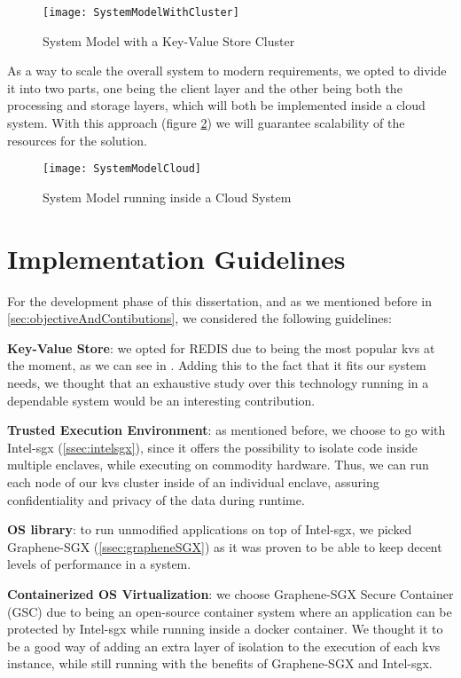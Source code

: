 \begin{figure}[htbp]
	\centering
	{\texttt{[image: SystemModelWithCluster]}}
	\caption{System Model with a Key-Value Store Cluster}
	\label{fig:systemModelCluster}
\end{figure}

As a way to scale the overall system to modern requirements, we opted to divide it into two parts, one being the client layer and the other being both the processing and storage layers, which will both be implemented inside a cloud system. With this approach (figure \ref{fig:systemModelCloud}) we will guarantee scalability of the resources for the solution. 

\begin{figure}[htbp]
	\centering
	{\texttt{[image: SystemModelCloud]}}
	\caption{System Model running inside a Cloud System}
	\label{fig:systemModelCloud}
\end{figure}

\section{Implementation Guidelines} %

For the development phase of this dissertation, and as we mentioned before in \ref{sec:objectiveAndContibutions}, we considered the following guidelines:

\textbf{Key-Value Store}: we opted for REDIS due to being the most popular \gls{kvs} at the moment, as we can see in \cite{rankingKVStores}. Adding this to the fact that it fits our system needs, we thought that an exhaustive study over this technology running in a dependable system would be an interesting contribution.

\textbf{Trusted Execution Environment}: as mentioned before, we choose to go with Intel-\gls{sgx} (\ref{ssec:intelsgx}), since it offers the possibility to isolate code inside multiple enclaves, while executing on commodity hardware. Thus, we can run each node of our \gls{kvs} cluster inside of an individual enclave, assuring confidentiality and privacy of the data during runtime.

\textbf{OS library}: to run unmodified applications on top of Intel-\gls{sgx}, we picked Graphene-SGX (\ref{ssec:grapheneSGX}) as it was proven to be able to keep decent levels of performance in a system.

\textbf{Containerized OS Virtualization}: we choose Graphene-SGX Secure Container (GSC) \cite{gsc} due to being an open-source container system where an application can be protected by Intel-\gls{sgx} while running inside a docker \cite{} container. We thought it to be a good way of adding an extra layer of isolation to the execution of each \gls{kvs} instance, while still running with the benefits of Graphene-SGX and Intel-\gls{sgx}.

